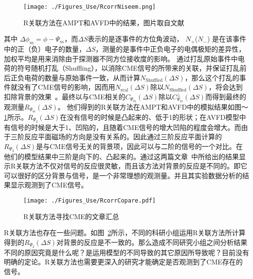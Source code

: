 \begin{figure}[htb]
\begin{center}
\texttt{[image: ./Figures\_Use/RcorrNiseem.png]}
\end{center}
\caption[R关联方法在AMPT和AVFD中的结果]{R关联方法在AMPT和AVFD中的结果，图片取自文献~\cite{RCorr-2018}}
\label{fig:RcorrNiseem}
\end{figure}

\noindent 其中 $\Delta\phi_m = \phi - \Psi_m$，而$\Delta S$表示的是逐事件的方位角波动， $N_+$($N_-$) 是在该事件中的正（负）电子的数量，$\Delta S$，测量的是事件中正负电子的电偶极矩的差异性，加权平均是用来消除由于探测器不同方位接收度的影响。 通过打乱原始事件中电荷的符号随机打乱（Shuffling），以消除CME信号的所带来的关联，并保证打乱前后正负电荷的数量与原始事件一致，从而计算$N_{\text{Shuffled}}(\Delta S)$，那么这个打乱的事件就没有了CME信号的影响，因而用$N_{\text{real}}(\Delta S)$除以$N_{\text{Shuffled}}(\Delta S)$，将会达到扣除背景的效果~\cite{RCorr-2011,RCorr-2018}。最终以与CME相关的$C_{\Psi_m}(\Delta S)$除以$C_{\Psi_m}^{\perp}(\Delta S)$而得到最终的观测量$R_{\Psi_m}(\Delta S)$。
他们得到的R关联方法在AMPT和AVFD中的模拟结果如图～\ref{fig:RcorrNiseem}所示。$R_{\Psi_2}(\Delta S)$在没有信号的时候是凸起来的、低于1的形状；在AVFD模型中有信号的时候是大于1、凹陷的，且随着CME信号的增大凹陷的程度会增大。而由于三阶反应平面磁场的方向是没有关系的。因此通过三阶反应平面计算的$R_{\Psi_3}(\Delta S)$是与CME信号无关的背景项，因此可以与二阶的信号的一个对比。在他们的模型结果中三阶是向下的、凸起来的。通过这两篇文章~\cite{RCorr-2011,RCorr-2018}中所给出的结果显示R关联方法不仅对信号的反应很灵敏，而且该方法对背景的反应是不同的。即它可以很好的区分背景与信号，是一个非常理想的观测量。并且其实验数据分析的结果显示观测到了CME信号。

\begin{figure}[htb]
\begin{center}
\texttt{[image: ./Figures\_Use/RcorrCopare.pdf]}
\end{center}
\caption{R关联方法寻找CME的文章汇总}
\label{tab:RcorrCopare}
\end{figure}

R关联方法也存在一些问题。如图~\ref{tab:RcorrCopare}所示，不同的科研小组运用R关联方法所计算得到的$R_{\Psi_2}(\Delta S)$对背景的反应是不一致的。那么造成不同研究小组之间分析结果不同的原因究竟是什么呢？是运用模型的不同导致的其它原因所导致呢？目前没有明确的定论。R关联方法也需要更深入的研究才能确定是否观测到了CME存在的信号。





